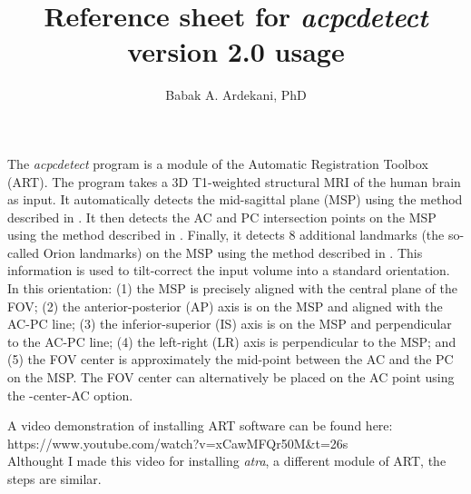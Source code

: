\documentclass[11pt]{article}
\title{Reference sheet for {\it acpcdetect} version 2.0 usage}
\author{Babak A. Ardekani, PhD}
\begin{document}
\maketitle
{} 
The {\it acpcdetect} program is a module of the Automatic Registration Toolbox (ART). 
The program takes a 3D T1-weighted structural MRI of the human brain as input. 
It automatically detects the mid-sagittal plane (MSP) using the method described in \citep{pmid9533596}.
It then detects the AC and PC intersection points on the MSP using the method described in \citep{pmid19264138}. 
Finally, it detects 8 additional landmarks (the so-called Orion landmarks) on the MSP using the method 
described in \citep{ardekani2018}.  
This information is used to tilt-correct the input volume into a standard orientation.  
In this orientation: (1) the MSP is precisely aligned with the central plane of the FOV; 
(2) the anterior-posterior (AP) axis is on the MSP and aligned with the AC-PC line; 
(3) the inferior-superior (IS) axis is on the MSP and perpendicular to the AC-PC line; 
(4) the left-right (LR) axis is perpendicular to the MSP; and 
(5) the FOV center is approximately the mid-point between the AC and the PC on the MSP. 
The FOV center can alternatively be placed on the AC point using the -center-AC option.  
\vspace{3mm}

A video demonstration of installing ART software can be found here:
https://www.youtube.com/watch?v=xCawMFQr50M\&t=26s \\
Althought I made this video for installing {\it atra}, a different module of ART, the steps are similar.
\end{document}
